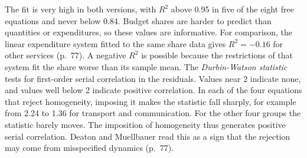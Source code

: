 The fit is very high in both versions, with $R^2$ above 0.95 in five of the eight free equations and
never below 0.84. Budget
shares are harder to predict than quantities or expenditures, so these values are informative. For
comparison, the linear expenditure system fitted to the same share data gives $R^2 = -0.16$ for other
services (p.~77). A negative $R^2$ is possible because the restrictions of that system fit the share worse
than its sample mean. The \emph{Durbin-Watson statistic} tests for first-order serial correlation in the
residuals. Values near 2 indicate none, and values well below 2 indicate positive correlation. In each of
the four equations that reject homogeneity, imposing it makes the statistic fall sharply, for example
from 2.24 to 1.36 for transport and communication. For the other four groups the statistic barely moves.
The imposition of homogeneity thus generates positive serial correlation. Deaton and Muellbauer read this
as a sign that the rejection may come from misspecified dynamics (p.~77).

